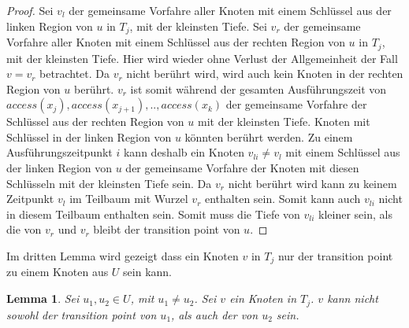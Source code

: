 \documentclass[a4paper,12pt]{article}
\begin{document}
\begin{proof}
 Sei $v_l$ der gemeinsame Vorfahre aller Knoten mit einem Schlüssel aus der linken Region von $u$ in $T_j$, mit der kleinsten Tiefe. Sei $v_r$ der gemeinsame Vorfahre aller Knoten mit einem Schlüssel aus der rechten Region von $u$ in $T_j$, mit der kleinsten Tiefe. Hier wird wieder ohne Verlust der Allgemeinheit der Fall $v = v_r$ betrachtet. Da $v_r$ nicht berührt wird, wird auch kein Knoten in der rechten Region von $u$ berührt. $v_r$ ist somit während der gesamten Ausführungszeit von $\textit{access}\left(x_j\right),\textit{access}\left(x_{j+1}\right),..,\textit{access}\left(x_k\right)$  der gemeinsame Vorfahre der Schlüssel aus der rechten Region von $u$ mit der kleinsten Tiefe. Knoten mit Schlüssel in der linken Region von $u$ könnten berührt werden. Zu einem Ausführungszeitpunkt $i$ kann deshalb ein Knoten $v_{li} \ne v_l$ mit einem Schlüssel aus der linken Region von $u$ der gemeinsame Vorfahre der Knoten mit diesen Schlüsseln mit der kleinsten Tiefe sein. Da $v_r$ nicht berührt wird kann zu keinem Zeitpunkt $v_l$ im Teilbaum mit Wurzel $v_r$ enthalten sein. Somit kann auch $v_{li}$ nicht in diesem Teilbaum enthalten sein. Somit muss die Tiefe von  $v_{li}$ kleiner sein, als die von $v_r$ und $v_r$ bleibt der transition point von $u$. 
\end{proof}

Im dritten Lemma wird gezeigt dass ein Knoten $v$ in $T_j$ nur der transition point zu einem Knoten aus $U$ sein kann.

\newtheorem{Lemma3}{Lemma}[section] \label{lemmaDemaine3}
\begin{Lemma3}
	Sei $u_1, u_2 \in U$, mit $u_1 \ne u_2$.  Sei $v$ ein Knoten in $T_j$. $v$ kann nicht sowohl der transition point von $u_1$, als auch der von $u_2$ sein.
\end{Lemma3}
\end{document}
